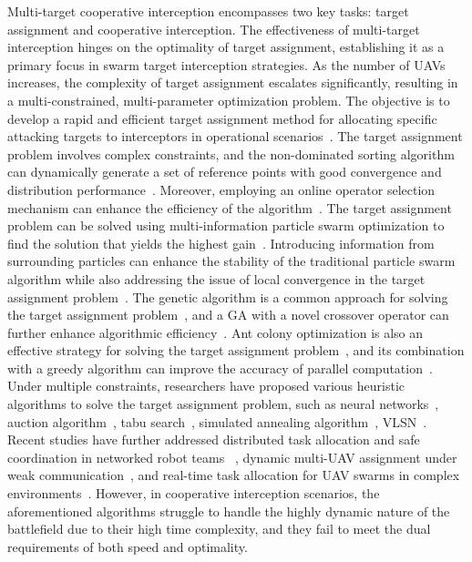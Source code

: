 \documentclass[lettersize,journal]{IEEEtran}
\begin{document}
Multi-target cooperative interception encompasses two key tasks: target assignment and
cooperative interception.
The effectiveness of multi-target interception hinges on the optimality of target assignment,
establishing it as a primary focus in swarm target interception strategies.
As the number of UAVs increases, the complexity of target assignment escalates significantly,
resulting in a multi-constrained, multi-parameter optimization problem.
The objective is to develop a rapid and efficient target assignment method for allocating
specific attacking targets to interceptors in operational scenarios~\cite{KLINE2019226}.
The target assignment problem involves complex constraints, and the non-dominated sorting
algorithm can dynamically generate a set of reference points with good convergence and
distribution performance~\cite{WANG2025952,bai2024hybrid,zou2024moea}.
Moreover, employing an online operator selection mechanism can enhance the efficiency of the
algorithm~\cite{ahmad2024fuzzy,ming2024constrained}.
The target assignment problem can be solved using multi-information particle swarm optimization
to find the solution that yields the highest gain~\cite{mishra2015weapon,wei2020particle}.
Introducing information from surrounding particles can enhance the stability of the traditional
particle swarm algorithm while also addressing the issue of local convergence in the target
assignment problem~\cite{long2024improved}.
The genetic algorithm is a common approach for solving the target assignment
problem~\cite{he4914655modelling,li2020multi,sun2022multi,chang2018solving}, and a GA with a
novel crossover operator can further enhance algorithmic efficiency~\cite{weng2024diversity}.
Ant colony optimization is also an effective strategy for solving the target assignment
problem~\cite{li2024comprehensive}, and its combination with a greedy algorithm can improve
the accuracy of parallel computation~\cite{yi2024solving}.
Under multiple constraints, researchers have proposed various heuristic algorithms to solve the
target assignment problem, such as neural networks~\cite{li2024comprehensive}, auction
algorithm~\cite{wang2024collaborative}, tabu search~\cite{yao2024tabu}, simulated annealing
algorithm~\cite{khurshid2024hybrid}, VLSN~\cite{yue2024graph}.
Recent studies have further addressed distributed task allocation
and safe coordination in networked robot teams
~\cite{miele2025distributed}, dynamic multi-UAV assignment under weak
communication~\cite{yu2025dynamic}, and real-time task allocation for UAV
swarms in complex environments~\cite{wang2026realtime}.
However, in cooperative interception scenarios, the aforementioned algorithms struggle to
handle the highly dynamic nature of the battlefield due to their high time complexity, and they
fail to meet the dual requirements of both speed and optimality.
\end{document}
